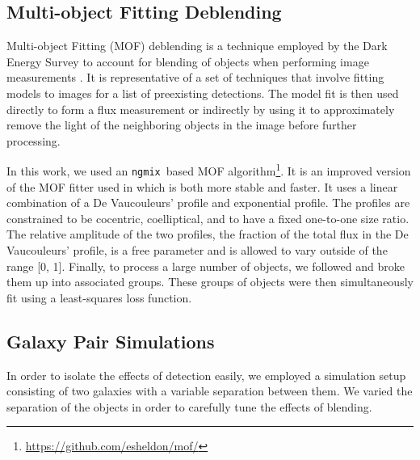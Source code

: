 \documentclass[iop, appendixfloats, numberedappendix, apj]{emulateapj}
\newcommand{\ngmix}{\texttt{ngmix}}
\begin{document}
\subsection{Multi-object Fitting Deblending}

Multi-object Fitting (MOF) deblending is a technique employed by the Dark
Energy Survey to account for blending of objects when performing image
measurements \citep{DESY1cat}. It is representative of a set of techniques that
involve fitting models to images for a list of preexisting detections. The
model fit is then used directly to form a flux measurement or indirectly by
using it to approximately remove the light of the neighboring objects in the
image before further processing.

In this work, we used an \ngmix\ based MOF
algorithm\footnote{\url{https://github.com/esheldon/mof/}}. It is an improved
version of the MOF fitter used in \cite{DESY1cat} which is
both more stable and faster. It uses a linear combination of a De Vaucouleurs'
\citep{devauc1948} profile and exponential profile. The profiles are
constrained to be cocentric, coelliptical, and to have a fixed one-to-one size
ratio.  The relative amplitude of the two profiles, the fraction of the total
flux in the De Vaucouleurs' profile, is a free parameter and is allowed to vary
outside of the range [0, 1]. Finally, to process a large number of objects, we
followed \citet{DESY1cat} and broke them up into associated groups.  These
groups of objects were then simultaneously fit using a least-squares loss
function.

\subsection{Galaxy Pair Simulations}
\label{sec:sims:pairs}

In order to isolate the effects of detection easily, we employed a simulation
setup consisting of two galaxies with a variable separation between them.  We
varied the separation of the objects in order to carefully tune the effects of
blending.
\end{document}
